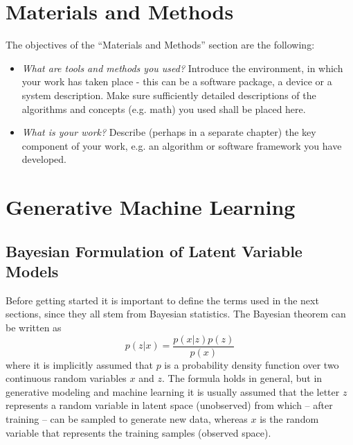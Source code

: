 %
\newpage
\chapter{Materials and Methods}
The objectives of the ``Materials and Methods'' section are the following:
\begin{itemize}
    \item \textit{What are tools and methods you used?} Introduce the environment, in which your work has taken place - this can be a software package, a device or a system description. Make sure sufficiently detailed descriptions of the algorithms and concepts (e.g. math) you used shall be placed here.
    \item \textit{What is your work?} Describe (perhaps in a separate chapter) the key component of your work, e.g. an algorithm or software framework you have developed.
\end{itemize}


\chapter{Generative Machine Learning}
\section{Bayesian Formulation of Latent Variable Models}
Before getting started it is important to define the terms used in the next sections, since they all stem from Bayesian
statistics. The Bayesian theorem can be written as
\begin{equation}
    p(z|x) = \frac{p(x|z)p(z)}{p(x)}
\end{equation}
where it is implicitly assumed that $p$ is a probability density function over two continuous random variables $x$ and $z$. The formula holds in general, but in generative modeling and machine learning it is usually assumed that the letter $z$ represents a random variable in latent space (unobserved) from which -- after training -- can be sampled to generate new data, whereas $x$ is the random variable that represents the training samples (observed space).

